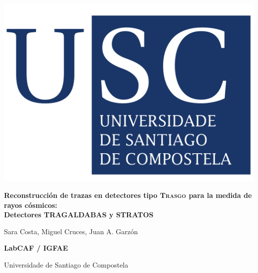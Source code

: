\documentclass[a4paper]{article}
\begin{document}
\begin{centering}

\begin{minipage}[c]{0.4\linewidth}
    \centering
\includegraphics[height=5\baselineskip]{LogoUSC}
\end{minipage}

	\vspace{1.5cm}
    {\huge\bfseries Reconstrucci\'on de trazas en detectores tipo \textsc{Trasgo} para la medida de rayos cósmicos:\\
    Detectores TRAGALDABAS y STRATOS
    \par}
  
\vspace{0.5cm}

{\Large  Sara Costa, Miguel Cruces,   Juan A. Garzón}
	
	\vspace{0.5cm}

	{\large\bfseries LabCAF / IGFAE  \par Universidade de Santiago de Compostela}

	\vspace{1cm}

\end{centering}


\end{document}
